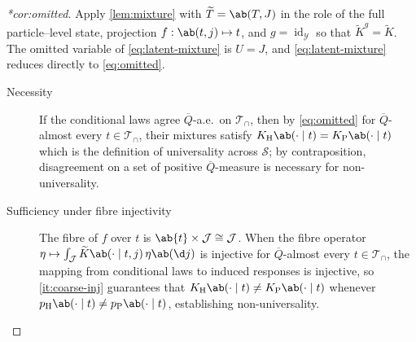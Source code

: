 \documentclass[12pt]{article}
\newcommand{\Herwig}{\mathrm{H}}
\newcommand{\Pythia}{\mathrm{P}}
\newcommand{\Gens}{\mathcal{S}}
\newcommand{\1}{\mathbbm{1}}
\renewcommand{\[}{\begin{equation}}
\renewcommand{\]}{\end{equation}}
\begin{document}
\begin{proof}[*cor:omitted]
        Apply \cref{lem:mixture} with \(\widetilde T = \ab(T, J)\) in the role of the full particle--level state, projection \(f: \ab(t,j) \mapsto t\), and \(g = \operatorname{id}_{\mathcal Y}\) so that \(\widetilde{K}^g = \widetilde{K}\).
        The omitted variable of \cref{eq:latent-mixture} is \(U=J\), and \cref{eq:latent-mixture} reduces directly to \cref{eq:omitted}.

        \begin{description}
            \item[Necessity] If the conditional laws agree \(\overline Q\)-a.e.\ on \(\mathcal T_\cap\), then by \cref{eq:omitted} for \(\overline Q\)-almost every \(t \in \mathcal T_\cap\), their mixtures satisfy \(K_\Herwig \ab(\cdot \mid t) = K_\Pythia \ab(\cdot \mid t)\) which is the definition of universality across \(\Gens\); by contraposition, disagreement on a set of positive \(\overline Q\)-measure is necessary for non-universality.
            \item[Sufficiency under fibre injectivity] The fibre of \(f\) over \(t\) is \(\ab\{t\} \times \mathcal J \cong \mathcal J\). When the fibre operator \(\eta \mapsto \int_{\mathcal J} \widetilde K \ab(\cdot \mid t, j)\,\eta \ab(\d j)\) is injective for \(\overline Q\)-almost every \(t \in \mathcal T_\cap\), the mapping from conditional laws to induced responses is injective, so \cref{it:coarse-inj} guarantees that \(K_\Herwig \ab(\cdot \mid t) \ne K_\Pythia \ab(\cdot \mid t)\) whenever \(p_\Herwig \ab(\cdot \mid t) \ne p_\Pythia \ab(\cdot \mid t)\), establishing non-universality.
        \end{description}
    \end{proof}
\end{document}
